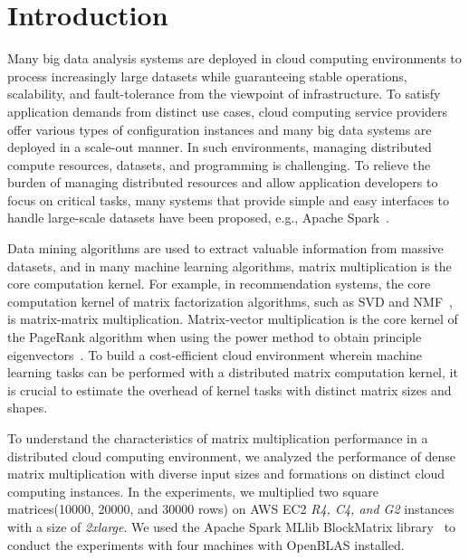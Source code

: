 \documentclass[10pt, conference, compsocconf]{IEEEtran}
\begin{document}
\IEEEpeerreviewmaketitle

\section{Introduction}\label{sec:intro}
Many big data analysis systems are deployed in cloud computing environments to process increasingly large datasets while guaranteeing stable operations, scalability, and fault-tolerance from the viewpoint of infrastructure. To satisfy application demands from distinct use cases, cloud computing service providers offer various types of configuration instances and many big data systems are deployed in a scale-out manner. In such environments, managing distributed compute resources, datasets, and programming is challenging. To relieve the burden of managing distributed resources and allow application developers to focus on critical tasks, many systems that provide simple and easy interfaces to handle large-scale datasets have been proposed, e.g., Apache Spark~\cite{spark}.

Data mining algorithms are used to extract valuable information from massive datasets, and in many machine learning algorithms, matrix multiplication is the core computation kernel. For example, in recommendation systems, the core computation kernel of matrix factorization algorithms, such as SVD and NMF~\cite{nmf}, is matrix-matrix multiplication. Matrix-vector multiplication is the core kernel of the PageRank algorithm when using the power method to obtain principle eigenvectors~\cite{pagerank}. To build a cost-efficient cloud environment wherein machine learning tasks can be performed with a distributed matrix computation kernel, it is crucial to estimate the overhead of kernel tasks with distinct matrix sizes and shapes.

To understand the characteristics of matrix multiplication performance in a distributed cloud computing environment, we analyzed the performance of dense matrix multiplication with diverse input sizes and formations on distinct cloud computing instances. In the experiments, we multiplied two square matrices(10000, 20000, and 30000 rows) on AWS EC2 \textit{R4, C4, and G2} instances with a size of \textit{2xlarge}. We used the Apache Spark MLlib BlockMatrix library~\cite{spark-mm} to conduct the experiments with four machines with OpenBLAS installed.
\end{document}
